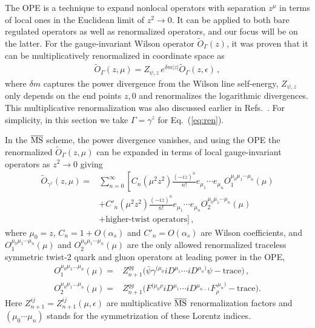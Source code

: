 \documentclass[prd,aps,twocolumn,preprintnumbers,showpacs,nofootinbib,superscriptaddress,notitlepage]{revtex4-1}
\newcommand{\beq}{\begin{eqnarray}}
\newcommand{\eeq}{\end{eqnarray}}
\newcommand{\nn}{\nonumber}
\DeclareRobustCommand{\eq}[1]{Eq.~(\ref{eq:#1})}
\begin{document}
The OPE is a technique to expand nonlocal operators with separation $z^\mu$ in terms of local ones in the Euclidean limit of $z^2\to 0$.
It can be applied to both bare regulated operators as well as renormalized operators, and our focus will be on the latter. For the gauge-invariant Wilson operator $\tilde{O}_\Gamma(z)$, it was proven that it can be multiplicatively renormalized in  coordinate space as~\cite{Ji:2017oey,Ishikawa:2017faj}
\beq \label{eq:ren}
\tilde{O}_\Gamma(z,\mu) = Z_{\psi,z}\, e^{\delta m |z|} \tilde{O}_\Gamma(z,\epsilon)\,,
\eeq
where $\delta m$ captures the power divergence from the Wilson line self-energy, $Z_{\psi,z}$ only depends on the end points $z,0$ and renormalizes the logarithmic divergences. This multiplicative renormalization was also discussed earlier in Refs.~\cite{Ishikawa:2016znu,Chen:2016fxx,Constantinou:2017sej}.  For simplicity, in this section we take $\Gamma=\gamma^z$ for \eq{ren}.

In the $\overline{\rm MS}$ scheme, the power divergence vanishes, and using the OPE
the renormalized $\tilde{O}_\Gamma(z,\mu)$ can be expanded 
in terms of local gauge-invariant operators as $z^2\to 0$ giving
\begin{align}\label{eq:ope-tq}
\tilde{O}_{\gamma^z}(z,\mu) = & \sum_{n=0}^\infty \left[C_n ({\mu}^2 z^2)\frac{(-iz)^n}{n!} e_{\mu_1}\cdots 				e_{\mu_n}O_1^{\mu_0\mu_1\cdots\mu_n}(\mu)\right. \nn\\
&+C'_n ({\mu}^2 z^2)\frac{(-iz)^n}{n!} e_{\mu_1}\cdots e_{\mu_n}O_2^{\mu_0\mu_1\cdots\mu_n}(\mu)\nn\\
& +  \text{higher-twist operators}\Big]\,,
\end{align}
where $\mu_0=z$, $C_n=1+O(\alpha_s)$ and $C'_n=O(\alpha_s)$ are Wilson coefficients, and $O_1^{\mu_0\mu_1\cdots\mu_n}(\mu)$ and $O_2^{\mu_0\mu_1\cdots\mu_n}(\mu)$ are the only allowed renormalized traceless symmetric twist-2 quark and gluon operators at leading power in the OPE,
\begin{align}\label{eq:twist-2}
O_1^{{\mu}_0 {\mu}_1 \ldots {\mu}_n}(\mu) = & Z_{n+1}^{qq} \bigl(
 \bar{\psi} \gamma^{({\mu}_0 } iD^{{\mu}_1} \cdots iD^{ {\mu}_n)} \psi -
\text{trace} \bigr) \,,
  \\
O_2^{{\mu}_0 {\mu}_1 \ldots {\mu}_n}(\mu) = & Z_{n+1}^{qg}\bigl(
 F^{(\mu_0\rho} iD^{{\mu}_1} \cdots iD^{ {\mu}_{n-1}} F_\rho^{~\mu_n)} - \text{trace} \bigr)
  .\nn
\end{align}
Here $Z_{n+1}^{ij}=Z_{n+1}^{ij}(\mu,\epsilon)$ are multiplicative $\overline{\rm MS}$ renormalization factors and $(\mu_0 \cdots \mu_n)$ stands for the symmetrization of these Lorentz indices.
\end{document}
